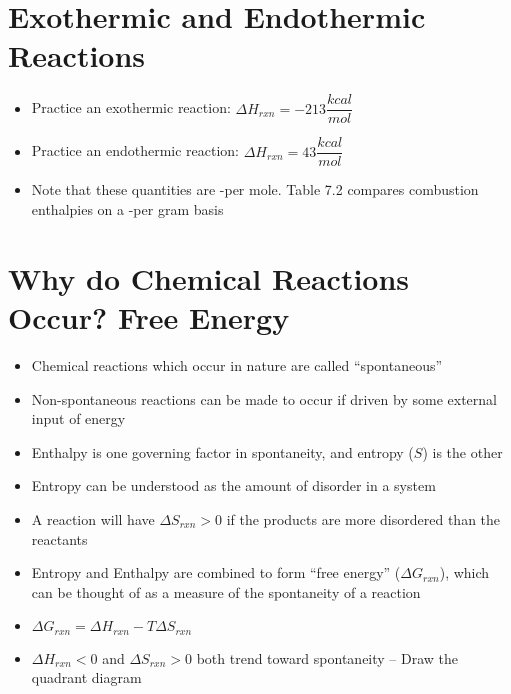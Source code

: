 \documentclass[12pt, openany, letterpaper]{memoir}
\begin{document}
\section{Exothermic and Endothermic Reactions}
\begin{itemize}
	\item Practice an exothermic reaction:  \hspace{1em} $\Delta H_{rxn}=-213\dfrac{kcal}{mol}$
	\item Practice an endothermic reaction:  \hspace{1em} $\Delta H_{rxn}=43\dfrac{kcal}{mol}$
	\item Note that these quantities are -per mole. Table 7.2 compares combustion enthalpies on a -per gram basis
\end{itemize}

\section{Why do Chemical Reactions Occur? Free Energy}
\begin{itemize}
	\item Chemical reactions which occur in nature are called ``spontaneous''
	\item Non-spontaneous reactions can be made to occur if driven by some external input of energy
	\item Enthalpy is one governing factor in spontaneity, and entropy ($S$) is the other
	\item Entropy can be understood as the amount of disorder in a system
	\item A reaction will have $\Delta S_{rxn}>0$ if the products are more disordered than the reactants
	\item Entropy and Enthalpy are combined to form ``free energy'' ($\Delta G_{rxn}$), which can be thought of as a measure of the spontaneity of a reaction
	\item $\Delta G_{rxn} = \Delta H_{rxn} - T\Delta S_{rxn}$
	\item $\Delta H_{rxn}<0$ and $\Delta S_{rxn}>0$ both trend toward spontaneity -- Draw the quadrant diagram
\end{itemize}
\end{document}
